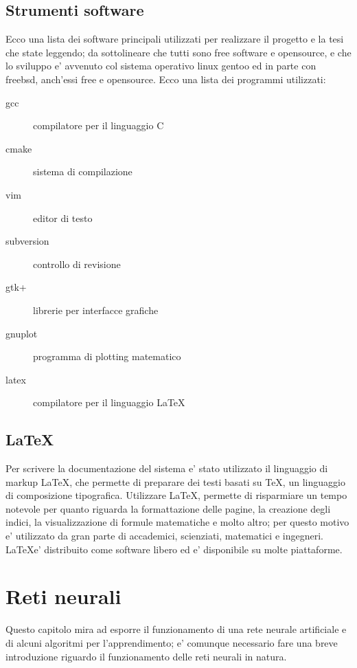 \documentclass[a4paper,10pt]{report}
\begin{document}
\section{Strumenti software}
Ecco una lista dei software principali utilizzati per realizzare il progetto e la tesi
che state leggendo; da sottolineare che tutti sono free software e opensource, e che 
lo sviluppo e' avvenuto col sistema operativo linux gentoo ed in parte con freebsd, 
anch'essi free e opensource.
Ecco una lista dei programmi utilizzati:
\begin{description}
\item[gcc] compilatore per il linguaggio C
\item[cmake] sistema di compilazione
\item[vim] editor di testo
\item[subversion] controllo di revisione
\item[gtk+] librerie per interfacce grafiche
\item[gnuplot] programma di plotting matematico
\item[latex] compilatore per il linguaggio \LaTeX
\end{description}



\section{\LaTeX}
Per scrivere la documentazione del sistema e' stato utilizzato il linguaggio di markup
\LaTeX, che permette di preparare dei testi basati su \TeX, un linguaggio di composizione 
tipografica. Utilizzare \LaTeX, permette di risparmiare un tempo notevole per quanto riguarda
la formattazione delle pagine, la creazione degli indici, la visualizzazione di formule matematiche
e molto altro; per questo motivo e' utilizzato da gran parte di accademici, scienziati, matematici
e ingegneri. \LaTeX e' distribuito come software libero ed e' disponibile su molte piattaforme.





\chapter{Reti neurali}
Questo capitolo mira ad esporre il funzionamento di una rete neurale artificiale
e di alcuni algoritmi per l'apprendimento; e' comunque necessario fare una breve
introduzione riguardo il funzionamento delle reti neurali in natura.
\end{document}
